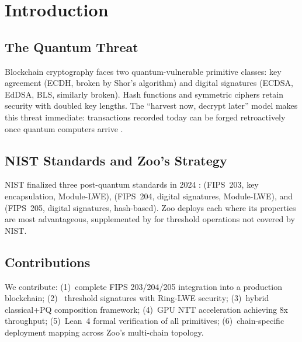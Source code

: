 \section{Introduction}


\subsection{The Quantum Threat}

Blockchain cryptography faces two quantum-vulnerable primitive classes: key agreement (ECDH, broken by Shor's algorithm) and digital signatures (ECDSA, EdDSA, BLS, similarly broken). Hash functions and symmetric ciphers retain security with doubled key lengths. The ``harvest now, decrypt later'' model makes this threat immediate: transactions recorded today can be forged retroactively once quantum computers arrive \cite{shor1997polynomial}.

\subsection{NIST Standards and Zoo's Strategy}

NIST finalized three post-quantum standards in 2024 \cite{nist2024pqc}: \MLKEM{} (FIPS~203, key encapsulation, Module-LWE), \MLDSA{} (FIPS~204, digital signatures, Module-LWE), and \SLHDSA{} (FIPS~205, digital signatures, hash-based). Zoo deploys each where its properties are most advantageous, supplemented by \Corona{} for threshold operations not covered by NIST.

\subsection{Contributions}

We contribute: (1)~complete FIPS 203/204/205 integration into a production blockchain; (2)~\Corona{} threshold signatures with Ring-LWE security; (3)~hybrid classical+PQ composition framework; (4)~GPU NTT acceleration achieving 8x throughput; (5)~Lean~4 formal verification of all primitives; (6)~chain-specific deployment mapping across Zoo's multi-chain topology.

